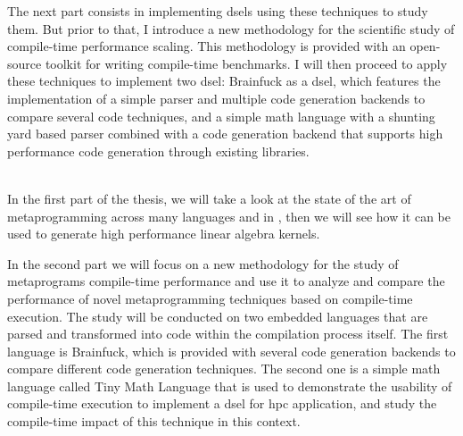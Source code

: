 \documentclass[main]{subfiles}
\begin{document}
The next part consists in implementing \glspl{dsel} using these techniques
to study them. But prior to that, I introduce a new methodology
for the scientific study of compile-time performance scaling.
This methodology is provided with an open-source toolkit for writing
\cpp compile-time benchmarks. I will then proceed to apply these
techniques to implement two \gls{dsel}:
Brainfuck as a \gls{dsel}, which features the implementation of a simple parser
and multiple code generation backends to compare several code techniques,
and a simple math language with a shunting yard based parser combined with
a code generation backend that supports high performance code generation
through existing \cpp libraries.



\\

In the first part of the thesis, we will take a look at the state of the art of
metaprogramming across many languages and in \cpp,
then we will see how it can be used to generate high performance linear algebra
kernels.

In the second part we will focus on a new methodology for the study of \cpp
metaprograms compile-time performance and use it to analyze and compare the
performance of novel \cpp metaprogramming techniques based on compile-time \cpp
execution. The study will be conducted on two embedded languages that are parsed
and transformed into \cpp code within the \cpp compilation process itself.
The first language is Brainfuck, which is provided with several code generation
backends to compare different code generation techniques. The second one
is a simple math language called Tiny Math Language that is used to demonstrate
the usability of compile-time \cpp execution to implement a \gls{dsel} for
\acrlong{hpc} application, and study the compile-time impact of this technique
in this context.
\end{document}
